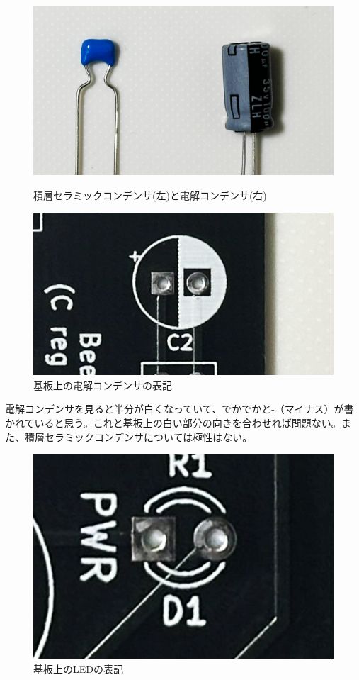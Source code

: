 \documentclass[xelatex,a5paper,ja=standard, openany]{bxjsbook}
\begin{document}
\begin{figure}[ht]
    \centering
    \begin{minipage}[t]{0.45\linewidth}
        \centering
        \includegraphics[keepaspectratio, width=\linewidth]{figure/capacitor.png}
        \caption{積層セラミックコンデンサ(左)と電解コンデンサ(右)}
        \label{fig:capacitor}
    \end{minipage}
    \begin{minipage}[t]{0.45\linewidth}
        \centering
        \includegraphics[keepaspectratio, width=\linewidth]{figure/kiban_capacitor.png}
        \caption{基板上の電解コンデンサの表記}
        \label{fig:capacitor_kiban}
    \end{minipage}
\end{figure}

電解コンデンサを見ると半分が白くなっていて、でかでかと-（マイナス）が書かれていると思う。これと基板上の白い部分の向きを合わせれば問題ない。また、積層セラミックコンデンサについては極性はない。\par

\hrulefill

\begin{figure}[h]
    \centering
    \includegraphics[width=0.3\linewidth]{figure/led_kiban.png}
    \caption{基板上のLEDの表記}
    \label{fig:led_kiban}
\end{figure}
\end{document}
